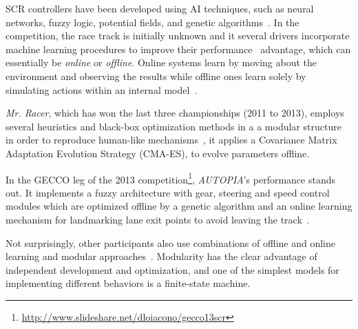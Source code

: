 



SCR controllers have been developed using AI techniques, such as neural networks, fuzzy logic, potential fields, and genetic algorithms~\cite{Loiacono:2012:LEA:2212908.2212953}. In the competition, the race track is initially unknown and it several drivers incorporate machine learning procedures to improve their performance~\cite{2009} advantage, which can essentially be \emph{online} or \emph{offline}. Online systems learn by moving about the environment and observing the results while offline ones learn solely by simulating actions within an internal model~\cite{mitchell_1997}.

\emph{Mr. Racer}, which has won the last three championships (2011 to 2013), employs several heuristics and black-box optimization methods in a a modular structure in order to reproduce human-like mechanisms~\cite{MrRacer}, it applies a Covariance Matrix Adaptation Evolution Strategy (CMA-ES), to evolve parameters offline.

In the GECCO leg of the 2013 competition\footnote{\url{http://www.slideshare.net/dloiacono/gecco13scr}}, \emph{AUTOPIA}'s performance stands out. It implements a fuzzy architecture with gear, steering and speed control modules which are optimized offline by a genetic algorithm and an online learning mechanism for landmarking lane exit points to avoid leaving the track~\cite{AUTOPIA}.

Not surprisingly, other participants also use combinations of offline and online learning and modular approaches~\cite{2009,DIEGO,Exp}. Modularity has the clear advantage of independent development and optimization\cite{MrRacer,AUTOPIA2009}, and one of the simplest models for implementing different behaviors is a finite-state machine.

